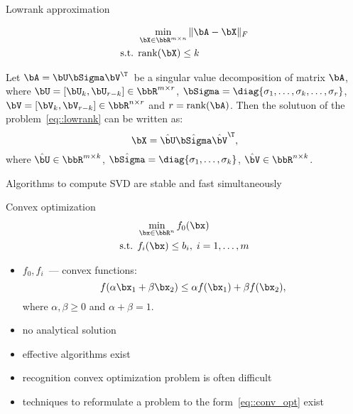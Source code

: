 \documentclass[12pt]{beamer}
\begin{document}
\begin{frame}{Lowrank approximation}

\begin{equation*}
\begin{split}
&\min\limits_{\bX \in \bbR^{m \times n}} \|\bA - \bX \|_F \\
\text{s.t. } & \text{rank}(\bX) \leq k
\end{split}
\label{eq::lowrank}
\end{equation*}

\begin{Theorem}
Let $\bA = \bU\bSigma\bV^{\T}$~be a singular value decomposition of matrix $\bA$, where $\bU = [\bU_k, \bU_{r-k}] \in \bbR^{m \times r}$, $\bSigma = \diag{\sigma_1, \ldots, \sigma_k, \ldots, \sigma_r}$, $\bV = [\bV_k, \bV_{r - k}] \in \bbR^{n \times r}$ and $r = \text{rank}(\bA)$.  
Then the solutuon of the problem~\eqref{eq::lowrank} can be written as:
\[
\bX = \hat{\bU} \hat{\bSigma} \hat{\bV}^{\T},
\]
where $\hat{\bU} \in \bbR^{m \times k}$, $\hat{\bSigma} = \diag{\sigma_1, \ldots, \sigma_k}$, $\hat{\bV} \in \bbR^{n \times k}$.
\end{Theorem}
\small Algorithms to compute SVD are stable and fast simultaneously
\end{frame}

\begin{frame}{Convex optimization}
\begin{equation}
\begin{split}
&\min\limits_{\bx \in \bbR^n} f_0(\bx)\\
\text{s.t. } & f_i(\bx) \leq b_i, \; i = 1,\ldots, m
\end{split}
\label{eq::conv_opt}
\end{equation}
\begin{itemize}
\item $f_0, f_i$~--- convex functions:
\[
f(\alpha \bx_1 + \beta \bx_2) \leq \alpha f(\bx_1) + \beta f(\bx_2),
\]
where $\alpha, \beta \geq 0$ and $\alpha + \beta = 1$.
\item no analytical solution
\item effective algorithms exist
\item recognition convex optimization problem is often difficult
\item techniques to reformulate a problem to the form~\eqref{eq::conv_opt} exist
\end{itemize}
\end{frame}
\end{document}
